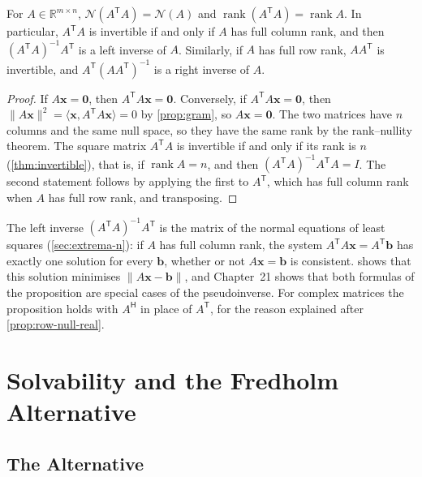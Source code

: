\begin{proposition}
\label{prop:gram-rank}
For $A\in\mathbb R^{m\times n}$, $\mathcal N(A^{\mathsf T}A)=\mathcal N(A)$ and $\operatorname{rank}(A^{\mathsf T}A)=\operatorname{rank}A$. In particular, $A^{\mathsf T}A$ is invertible if and only if $A$ has full column rank, and then $(A^{\mathsf T}A)^{-1}A^{\mathsf T}$ is a left inverse of $A$. Similarly, if $A$ has full row rank, $AA^{\mathsf T}$ is invertible, and $A^{\mathsf T}(AA^{\mathsf T})^{-1}$ is a right inverse of $A$.
\end{proposition}

\begin{proof}
If $A\mathbf x=\mathbf 0$, then $A^{\mathsf T}A\mathbf x=\mathbf 0$. Conversely, if $A^{\mathsf T}A\mathbf x=\mathbf 0$, then $\|A\mathbf x\|^2=\langle\mathbf x,A^{\mathsf T}A\mathbf x\rangle=0$ by \cref{prop:gram}, so $A\mathbf x=\mathbf 0$. The two matrices have $n$ columns and the same null space, so they have the same rank by the rank--nullity theorem. The square matrix $A^{\mathsf T}A$ is invertible if and only if its rank is $n$ (\cref{thm:invertible}), that is, if $\operatorname{rank}A=n$, and then $(A^{\mathsf T}A)^{-1}A^{\mathsf T}A=I$. The second statement follows by applying the first to $A^{\mathsf T}$, which has full column rank when $A$ has full row rank, and transposing.
\end{proof}

The left inverse $(A^{\mathsf T}A)^{-1}A^{\mathsf T}$ is the matrix of the normal equations of least squares (\cref{sec:extrema-n}): if $A$ has full column rank, the system $A^{\mathsf T}A\mathbf x=A^{\mathsf T}\mathbf b$ has exactly one solution for every $\mathbf b$, whether or not $A\mathbf x=\mathbf b$ is consistent.  shows that this solution minimises $\|A\mathbf x-\mathbf b\|$, and Chapter~21 shows that both formulas of the proposition are special cases of the pseudoinverse. For complex matrices the proposition holds with $A^{\mathsf H}$ in place of $A^{\mathsf T}$, for the reason explained after \cref{prop:row-null-real}.

\section{Solvability and the Fredholm Alternative}
\label{sec:fredholm}

\subsection{The Alternative}

